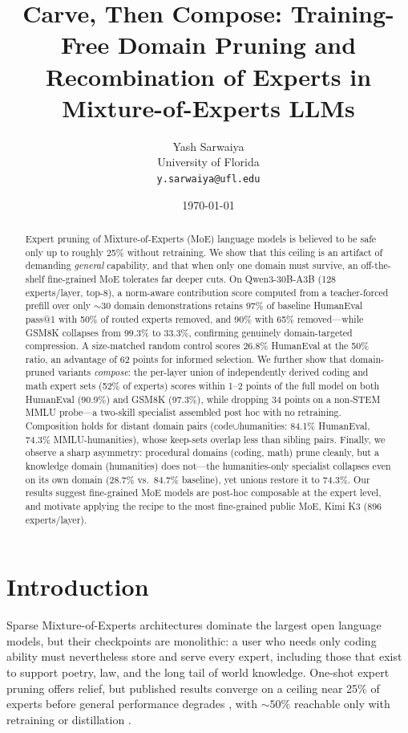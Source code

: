 \documentclass[11pt]{article}
\title{\textbf{Carve, Then Compose: Training-Free Domain Pruning and\\
Recombination of Experts in Mixture-of-Experts LLMs}}
\author{Yash Sarwaiya\\
\small University of Florida\\
\small \texttt{y.sarwaiya@ufl.edu}}
\date{\today}
\begin{document}
\maketitle

\begin{abstract}
Expert pruning of Mixture-of-Experts (MoE) language models is believed to be
safe only up to roughly 25\% without retraining. We show that this ceiling is
an artifact of demanding \emph{general} capability, and that when only one
domain must survive, an off-the-shelf fine-grained MoE tolerates far deeper
cuts. On Qwen3-30B-A3B (128 experts/layer, top-8), a norm-aware contribution
score computed from a teacher-forced prefill over only ${\sim}30$ domain
demonstrations retains 97\% of baseline HumanEval pass@1 with 50\% of routed
experts removed, and 90\% with 65\% removed---while GSM8K collapses from
99.3\% to 33.3\%, confirming genuinely domain-targeted compression. A
size-matched random control scores 26.8\% HumanEval at the 50\% ratio, an
advantage of 62 points for informed selection. We further show that
domain-pruned variants \emph{compose}: the per-layer union of independently
derived coding and math expert sets (52\% of experts) scores within 1--2
points of the full model on both HumanEval (90.9\%) and GSM8K (97.3\%), while
dropping 34 points on a non-STEM MMLU probe---a two-skill specialist
assembled post hoc with no retraining. Composition holds for distant domain
pairs (code$\cup$humanities: 84.1\% HumanEval, 74.3\% MMLU-humanities), whose
keep-sets overlap less than sibling pairs. Finally, we observe a sharp
asymmetry: procedural domains (coding, math) prune cleanly, but a knowledge
domain (humanities) does not---the humanities-only specialist collapses even
on its own domain (28.7\% vs.\ 84.7\% baseline), yet unions restore it to
74.3\%. Our results suggest fine-grained MoE models are post-hoc composable at
the expert level, and motivate applying the recipe to the most fine-grained
public MoE, Kimi K3 (896 experts/layer).
\end{abstract}

\section{Introduction}

Sparse Mixture-of-Experts architectures dominate the largest open language
models, but their checkpoints are monolithic: a user who needs only coding
ability must nevertheless store and serve every expert, including those that
exist to support poetry, law, and the long tail of world knowledge. One-shot
expert pruning offers relief, but published results converge on a ceiling near
25\% of experts before general performance degrades \cite{heapr,mone,moei2},
with ${\sim}50\%$ reachable only with retraining or distillation
\cite{moepruner}.
\end{document}
